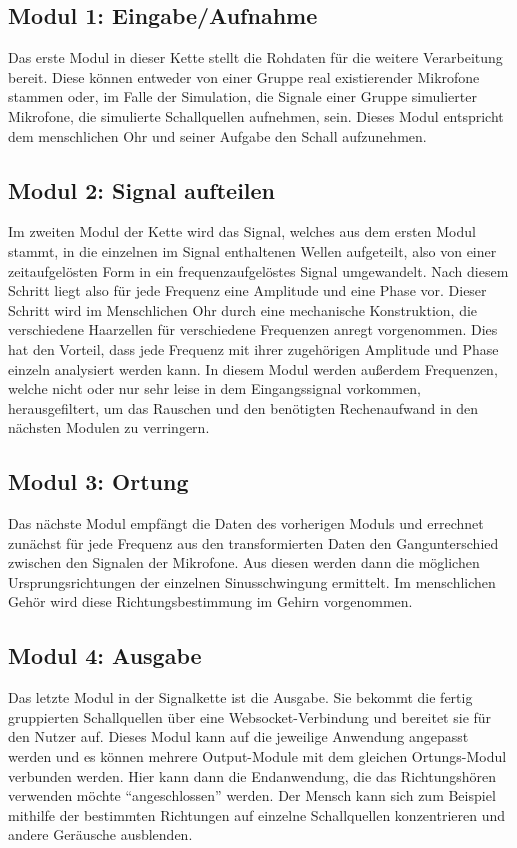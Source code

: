 \subsection{Modul 1: Eingabe/Aufnahme}
Das erste Modul in dieser Kette stellt die Rohdaten für die weitere Verarbeitung bereit. Diese  können entweder von einer Gruppe real existierender Mikrofone stammen oder, im Falle der Simulation, die Signale einer Gruppe simulierter Mikrofone, die simulierte Schallquellen aufnehmen, sein. Dieses Modul entspricht dem menschlichen Ohr und seiner Aufgabe den Schall aufzunehmen. 

\subsection{Modul 2: Signal aufteilen}
Im zweiten Modul der Kette wird das Signal, welches aus dem ersten Modul stammt, in die einzelnen im Signal enthaltenen Wellen aufgeteilt, also von einer zeitaufgelösten Form in ein frequenzaufgelöstes Signal umgewandelt. Nach diesem Schritt liegt also für jede Frequenz eine Amplitude und eine Phase vor. Dieser Schritt wird im Menschlichen Ohr durch eine mechanische Konstruktion, die verschiedene Haarzellen für verschiedene Frequenzen anregt vorgenommen. Dies hat den Vorteil, dass jede Frequenz mit ihrer zugehörigen Amplitude und Phase einzeln analysiert werden kann.
In diesem Modul werden außerdem Frequenzen, welche nicht oder nur sehr leise in dem Eingangssignal vorkommen, herausgefiltert, um das Rauschen und den benötigten Rechenaufwand in den nächsten Modulen zu verringern.

\subsection{Modul 3: Ortung}
Das nächste Modul empfängt die Daten des vorherigen Moduls und errechnet zunächst für jede Frequenz aus den transformierten Daten den Gangunterschied zwischen den Signalen der Mikrofone. Aus diesen werden dann die möglichen Ursprungsrichtungen der einzelnen Sinusschwingung ermittelt. Im menschlichen Gehör wird diese Richtungsbestimmung im Gehirn vorgenommen.

\subsection{Modul 4: Ausgabe}
Das letzte Modul in der Signalkette ist die Ausgabe. Sie bekommt die fertig gruppierten Schallquellen über eine Websocket-Verbindung und bereitet sie für den Nutzer auf. Dieses Modul kann auf die jeweilige Anwendung angepasst werden und es können mehrere Output-Module mit dem gleichen Ortungs-Modul verbunden werden. Hier kann dann die Endanwendung, die das Richtungshören verwenden möchte ``angeschlossen'' werden. Der Mensch kann sich zum Beispiel mithilfe der bestimmten Richtungen auf einzelne Schallquellen konzentrieren und andere Geräusche ausblenden.